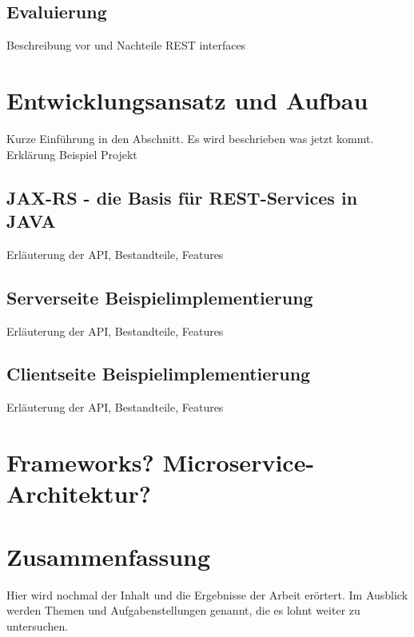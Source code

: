 \documentclass[fleqn,10pt,ngerman]{SelfArx}
\begin{document}
\subsection{Evaluierung}
Beschreibung vor und Nachteile REST interfaces

\section{Entwicklungsansatz und Aufbau}
Kurze Einführung in den Abschnitt. Es wird beschrieben was jetzt kommt. Erklärung Beispiel Projekt

\subsection{JAX-RS - die Basis für REST-Services in JAVA}
Erläuterung der API, Bestandteile, Features 

\subsection{Serverseite Beispielimplementierung}
Erläuterung der API, Bestandteile, Features 

\subsection{Clientseite Beispielimplementierung}
Erläuterung der API, Bestandteile, Features 

\section{Frameworks? Microservice-Architektur?}

\section{Zusammenfassung}
Hier wird nochmal der Inhalt und die Ergebnisse der Arbeit erörtert. Im Ausblick werden Themen und Aufgabenstellungen genannt, die es lohnt weiter zu untersuchen.





\end{document}
